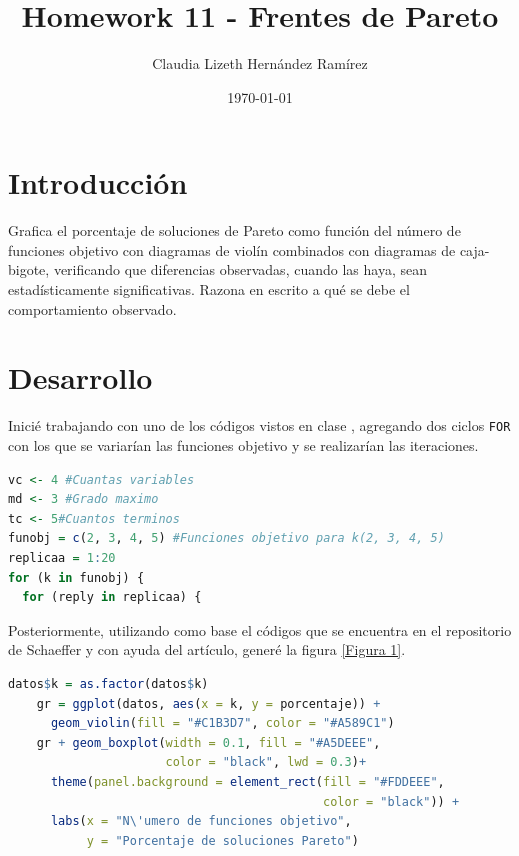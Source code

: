 \documentclass{article}
\author{Claudia Lizeth Hern\'andez Ram\'irez} %
\title{Homework 11 - Frentes de Pareto} %
\date{\today}
\begin{document}

\maketitle %



\section{Introducci\'{o}n}\label{intro} %
Grafica el porcentaje de soluciones de Pareto como funci\'on del n\'umero de funciones objetivo con diagramas de viol\'in combinados con diagramas de caja-bigote, verificando que diferencias observadas, cuando las haya, sean estad\'isticamente significativas. Razona en escrito a qu\'e se debe el comportamiento observado.


\section{Desarrollo}\label{desarrollo} %

Inici\'e trabajando con uno de los c\'odigos vistos en clase \citep{Parfronts}, agregando dos ciclos \texttt{FOR} con los que se variar\'ian las funciones objetivo y se realizar\'ian las iteraciones.

\begin{lstlisting}[language=R, caption= Segmento de c\'odigo ciclos \texttt{FOR} y definici\'on de variables.]
vc <- 4 #Cuantas variables
md <- 3 #Grado maximo
tc <- 5#Cuantos terminos
funobj = c(2, 3, 4, 5) #Funciones objetivo para k(2, 3, 4, 5)
replicaa = 1:20
for (k in funobj) {
  for (reply in replicaa) {
\end{lstlisting}


Posteriormente, utilizando como base el c\'odigos que se encuentra en el repositorio de Schaeffer \citep{Violin} y con ayuda del art\'iculo\citep{ggplotaest}, gener\'e la figura \ref{Figura 1}.
\begin{lstlisting}[language=R, caption= Segmento de c\'odigo gr\'afica.]
    datos$k = as.factor(datos$k)
    gr = ggplot(datos, aes(x = k, y = porcentaje)) +
      geom_violin(fill = "#C1B3D7", color = "#A589C1")
    gr + geom_boxplot(width = 0.1, fill = "#A5DEEE",
                      color = "black", lwd = 0.3)+
      theme(panel.background = element_rect(fill = "#FDDEEE",
                                            color = "black")) +
      labs(x = "N\'umero de funciones objetivo",
           y = "Porcentaje de soluciones Pareto")
\end{lstlisting}
\newpage
\end{document}
